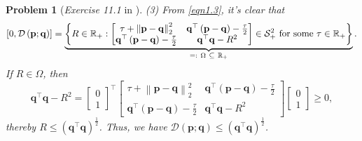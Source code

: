 \documentclass[11pt]{article}
\newtheorem{problem}{Problem}
\numberwithin{equation}{problem}
\begin{document}
\begin{problem} [\emph{Exercise 11.1} in \cite{calafiore2014optimization}]
{\indent (3) From \eqref{eqn1.3}, it's clear that
\begin{equation}
    \label{eqn1.4}
    \left[ 0, \mathcal{D} \left( \mathbf{p}; \mathbf{q} \right) \right]
    = \underbrace{\left\{ R \in \mathbb{R}_{+} : 
    \begin{bmatrix}
        \tau + \left\| \mathbf{p} - \mathbf{q} \right\|_{2}^2 & \mathbf{q}^{\top} \left( \mathbf{p} - \mathbf{q} \right) - \frac{\tau}{2} \\
        \mathbf{q}^{\top} \left( \mathbf{p} - \mathbf{q} \right) - \frac{\tau}{2} & \mathbf{q}^{\top} \mathbf{q} - R^2
    \end{bmatrix}
    \in \mathcal{S}_{+}^2 \textnormal{ for some $\tau \in \mathbb{R}_{+}$} \right\}}_{=: \ \Omega \ \subseteq \ \mathbb{R}_{+}}.
\end{equation}
If $R \in \Omega$, then 
\begin{equation*}
    \mathbf{q}^{\top} \mathbf{q} - R^2
    = \begin{bmatrix} 0 \\ 1 \end{bmatrix}^{\top}
    \begin{bmatrix}
        \tau + \left\| \mathbf{p} - \mathbf{q} \right\|_{2}^2 & \mathbf{q}^{\top} \left( \mathbf{p} - \mathbf{q} \right) - \frac{\tau}{2} \\
        \mathbf{q}^{\top} \left( \mathbf{p} - \mathbf{q} \right) - \frac{\tau}{2} & \mathbf{q}^{\top} \mathbf{q} - R^2
    \end{bmatrix}
    \begin{bmatrix} 0 \\ 1 \end{bmatrix}
    \geq 0,
\end{equation*}
thereby $R \leq \left( \mathbf{q}^{\top} \mathbf{q} \right)^{\frac{1}{2}}$. Thus, we have $\mathcal{D} \left( \mathbf{p}; \mathbf{q} \right) \leq \left( \mathbf{q}^{\top} \mathbf{q} \right)^{\frac{1}{2}}$.
\medskip

}
\end{problem}
\end{document}
